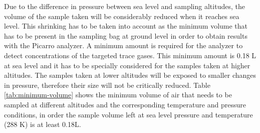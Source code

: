 \documentclass[a4paper,12pt,twoside]{article}
\begin{document}
Due to the difference in pressure between sea level and sampling altitudes, the volume of the sample taken will be considerably reduced when it reaches sea level. This shrinking has to be taken into account as the minimum volume that has to be present in the sampling bag at ground level in order to obtain results with the Picarro analyzer. A minimum amount is required for the analyzer to detect concentrations of the targeted trace gases. This minimum amount is 0.18 L at sea level and it has to be specially considered for the samples taken at higher altitudes. The samples taken at lower altitudes will be exposed to smaller changes in pressure, therefore their size will not be critically reduced. Table \ref{tab:minimum-volume} shows the minimum volume of air that needs to be sampled at different altitudes and the corresponding temperature and pressure conditions, in order the sample volume left at sea level pressure and temperature (288 K)  is at least 0.18L.  

\end{document}
